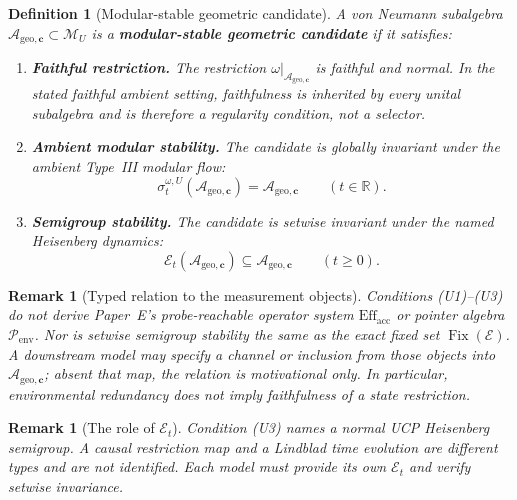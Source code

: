 \documentclass[12pt,a4paper]{article}
\newtheorem{definition}[theorem]{Definition}
\newtheorem{remark}[theorem]{Remark}
\begin{document}
\begin{definition}[Modular-stable geometric candidate]
\label{def:modular-accessible}
A von Neumann subalgebra $\mathcal{A}_{\mathrm{geo},\mathbf{c}}\subset\mathcal M_U$ is a \textbf{modular-stable geometric candidate} if it satisfies:

\begin{enumerate}
\item[\textup{(U1)}] \textbf{Faithful restriction.} The restriction $\omega|_{\mathcal{A}_{\mathrm{geo},\mathbf{c}}}$ is faithful and normal.  In the stated faithful ambient setting, faithfulness is inherited by every unital subalgebra and is therefore a regularity condition, not a selector.

\item[\textup{(U2)}] \textbf{Ambient modular stability.} The candidate is globally invariant under the ambient Type~III modular flow:
\begin{equation}
\sigma_t^{\omega,U}(\mathcal{A}_{\mathrm{geo},\mathbf{c}})
=\mathcal{A}_{\mathrm{geo},\mathbf{c}}
\qquad(t\in\mathbb R).
\end{equation}

\item[\textup{(U3)}] \textbf{Semigroup stability.} The candidate is setwise invariant under the named Heisenberg dynamics:
\begin{equation}
\mathcal E_t(\mathcal{A}_{\mathrm{geo},\mathbf{c}})
\subseteq\mathcal{A}_{\mathrm{geo},\mathbf{c}}
\qquad(t\ge0).
\end{equation}
\end{enumerate}
\end{definition}

\begin{remark}[Typed relation to the measurement objects]
\label{rem:translation}
Conditions (U1)--(U3) do not derive Paper~E's probe-reachable operator system $\mathrm{Eff}_{\mathrm{acc}}$ or pointer algebra $\mathcal P_{\mathrm{env}}$.  Nor is setwise semigroup stability the same as the exact fixed set $\operatorname{Fix}(\mathcal E)$.  A downstream model may specify a channel or inclusion from those objects into $\mathcal{A}_{\mathrm{geo},\mathbf{c}}$; absent that map, the relation is motivational only.  In particular, environmental redundancy does not imply faithfulness of a state restriction.
\end{remark}

\begin{remark}[The role of $\mathcal{E}_t$]
Condition (U3) names a normal UCP Heisenberg semigroup.  A causal restriction map and a Lindblad time evolution are different types and are not identified.  Each model must provide its own $\mathcal E_t$ and verify setwise invariance.
\end{remark}
\end{document}
